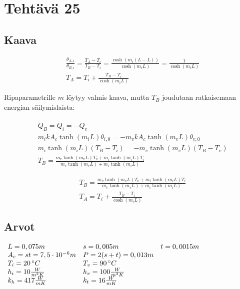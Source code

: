 \documentclass[12pt,a4paper,finnish]{article}
\begin{document}
\section{Tehtävä 25}

\subsection{Kaava}

\begin{align}
 &\frac{\theta_{A,i}}{\theta_{B,i}} = \frac{T_A - T_i}{T_B - T_i} = \frac{\cosh(m_i(L - L))}{\cosh(m_iL)} = \frac{1}{\cosh(m_iL)}\\
 &T_A = T_i + \frac{T_B - T_i}{\cosh(m_iL)}
\end{align}

Ripaparametrille $m$ löytyy valmis kaava, mutta $T_B$ joudutaan ratkaisemaan energian säilymislaista:

\begin{align}
 &\dot{Q}_B = \dot{Q}_i = -\dot{Q}_v\\
 &m_ikA_c\tanh(m_iL)\theta_{i,0} = -m_vkA_c\tanh(m_vL)\theta_{v,0}\\
 &m_i\tanh(m_iL)(T_B - T_i) = -m_v\tanh(m_vL)(T_B - T_v)\\
 &T_B = \frac{m_v\tanh(m_vL)T_v + m_i\tanh(m_iL)T_i}{m_v\tanh(m_vL) + m_i\tanh(m_iL)}
\end{align}

\begin{framed}
  \begin{align}
  &T_B = \frac{m_v\tanh(m_vL)T_v + m_i\tanh(m_iL)T_i}{m_v\tanh(m_vL) + m_i\tanh(m_iL)}\\
  &T_A = T_i + \frac{T_B - T_i}{\cosh(m_iL)}
  \end{align}
\end{framed}

\subsection{Arvot}

\begin{math}
 \begin{array}{l l l}
  L = 0,075m & s = 0,005m & t = 0,0015m\\
  A_c = st = 7,5\cdot10^{-6}m & P = 2(s + t) = 0,013m & \\
  T_i = 20\,^{\circ}C & T_v = 90\,^{\circ}C & \\
  h_i = 10 \frac{W}{m^2K} & h_v = 100 \frac{W}{m^2K} & \\
  k_h = 417 \frac{W}{mK} & k_t = 16 \frac{W}{mK}
 \end{array}
\end{math}
\end{document}
